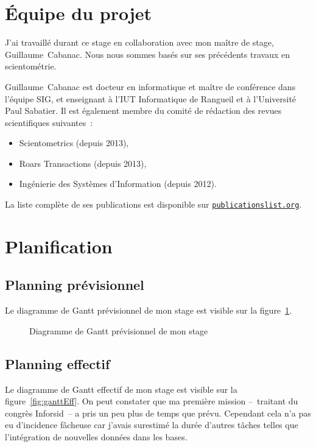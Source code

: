 \section{Équipe du projet}
	J'ai travaillé durant ce stage en collaboration avec mon maître de stage, Guillaume~Cabanac. Nous nous sommes basés sur ses précédents travaux en scientométrie.
	
	Guillaume~Cabanac est docteur en informatique et maître de conférence dans l'équipe SIG, et enseignant à l'IUT Informatique de Rangueil et à l'Université Paul Sabatier. Il est également membre du comité de rédaction des revues scientifiques suivantes~:
	\begin{itemize}
		\item Scientometrics (depuis 2013),
		\item Roars Transactions (depuis 2013),
		\item Ingénierie des Systèmes d'Information (depuis 2012).
	\end{itemize}
	
	La liste complète de ses publications est disponible sur \href{http://publicationslist.org/guillaume.cabanac}{\texttt{publicationslist.org}}.
	


\section{Planification}

	\subsection{Planning prévisionnel}
		Le diagramme de Gantt prévisionnel de mon stage est visible sur la figure~\ref{fig:ganttPrev}.
	
		\begin{figure}[p]
			\centering
			
			\caption{Diagramme de Gantt prévisionnel de mon stage}\label{fig:ganttPrev}
		\end{figure}


	\subsection{Planning effectif}
		Le diagramme de Gantt effectif de mon stage est visible sur la figure~\ref{fig:ganttEff}. On peut constater que ma première mission --~traitant du congrès Inforsid~-- a pris un peu plus de temps que prévu. Cependant cela n'a pas eu d'incidence fâcheuse car j'avais surestimé la durée d'autres tâches telles que l'intégration de nouvelles données dans les bases.
		
